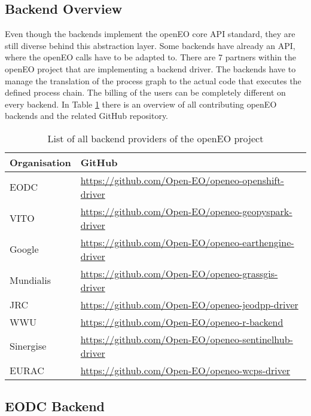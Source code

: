 \documentclass[draft,final]{vutinfth} %
\begin{document}
\subsection{Backend Overview}\label{Backend Overview}
Even though the backends implement the openEO core API standard, they are still diverse behind this abstraction layer. Some backends have already an API, where the openEO calls have to be adapted to. There are 7 partners within the openEO project that are implementing a backend driver. The backends have to manage the translation of the process graph to the actual code that executes the defined process chain. The billing of the users can be completely different on every backend. In Table \ref{Tab:backends} there is an overview of all contributing openEO backends and the related GitHub repository.
\begin{table}[]
	\caption{List of all backend providers of the openEO project}
	\begin{tabular}{l|l}
		\textbf{Organisation} & \textbf{GitHub}  \\ \hline
		EODC & \url{https://github.com/Open-EO/openeo-openshift-driver} \\ \hline 
		VITO & \url{https://github.com/Open-EO/openeo-geopyspark-driver} \\ \hline  
		Google  & \url{https://github.com/Open-EO/openeo-earthengine-driver} \\ \hline  
		Mundialis & \url{https://github.com/Open-EO/openeo-grassgis-driver} \\ \hline 
		JRC & \url{https://github.com/Open-EO/openeo-jeodpp-driver} \\ \hline
		WWU & \url{https://github.com/Open-EO/openeo-r-backend} \\ \hline
		Sinergise & \url{https://github.com/Open-EO/openeo-sentinelhub-driver} \\ \hline
		EURAC & \url{https://github.com/Open-EO/openeo-wcps-driver} \\ 
	\end{tabular}
	\label{Tab:backends}
\end{table}

\subsection{EODC Backend}\label{EODC Back End}
\end{document}
